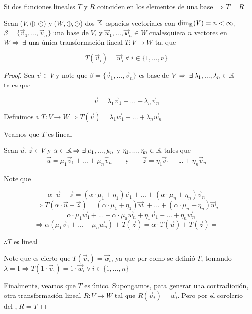 \begin{corollary}
    Si dos funciones lineales $T$ y $R$ coinciden en los elementos de una base $\Rightarrow T = R$
\end{corollary}

\begin{theorem} \label{theomonline1}
    Sean ($V, \oplus, \odot$) y ($W, \oplus, \odot$) dos $\mathbb{K}$-espacios vectoriales con $ {\dim}_{\mathbb{K}}(V) = n < \infty$, $\beta = \{ \vec{v}_{1}, ..., \vec{v}_{n} \}$ una base de $V$, y $\vec{w}_{1}, ..., \vec{w}_{n} \in W$ cualesquiera $n$ vectores en $W \Rightarrow \: \exists$ una única transformación lineal $T : V \to W$ tal que

    $$T(\vec{v}_{i}) = \vec{w}_{i} \: \forall \: i \in \{1, ..., n \}$$
\end{theorem}

\begin{proof}
    Sea $\vec{v} \in V$ y note que $\beta =  \{ \vec{v}_{1}, ..., \vec{v}_{n} \}$ es base de $V \Rightarrow \: \exists \: \lambda_1, ..., \lambda_n \in \mathbb{K}$ tales que

    $$\vec{v} = \lambda_1 \vec{v}_{1} + ... + \lambda_n \vec{v}_{n}$$

    Definimos a $T : V \to W \Rightarrow T(\vec{v}) = \lambda_1 \vec{w}_{1} + ... + \lambda_n \vec{w}_{n}$

    Veamos que $T$ es lineal

    Sean $\vec{u}, \vec{z} \in V$ y $\alpha \in \mathbb{K} \Rightarrow \exists \: \mu_1, ..., \mu_n $ y $\eta_1, ..., \eta_n \in \mathbb{K}$ tales que
    \begin{align*}
      \vec{u} = \mu_1 \vec{v}_{1} + ... + \mu_n \vec{v}_{n}  && \text{ y } && \vec{z} = \eta_1 \vec{v}_{1} + ... + \eta_n \vec{v}_{n}
    \end{align*}

    Note que 

    $$\alpha \cdot \vec{u} + \vec{z} = (\alpha \cdot \mu_1 + \eta_1)\vec{v}_{1} + ... + (\alpha \cdot \mu_n + \eta_n)\vec{v}_{n}$$
    $$\Rightarrow T (\alpha \cdot \vec{u} + \vec{z}) = (\alpha \cdot \mu_1 + \eta_1)\vec{w}_{1} + ... + (\alpha \cdot \mu_n + \eta_n)\vec{w}_{n}$$
    $$= \alpha \cdot \mu_1 \vec{w}_{1} + ... + \alpha \cdot \mu_n \vec{w}_{n} + \eta_1 \vec{v}_{1} + ... + \eta_n \vec{w}_{n}$$
    $$\Rightarrow \alpha (\mu_1 \vec{v}_{1} + ... + \mu_n \vec{w}_{n}) + T(\vec{z}) = \alpha \cdot T(\vec{u}) +  T(\vec{z}) =$$

    $\therefore T$ es lineal

    Note que es cierto que $T(\vec{v}_{i}) = \vec{w}_{i}$, ya que por como se definió $T$, tomando $\lambda = 1 \Rightarrow T(1 \cdot\vec{v}_{i}) = 1 \cdot \vec{w}_{i} \: \forall \: i \in \{1, ..., n \}$

    Finalmente, veamos que $T$ es único. Supongamos, para generar una contradicción, otra transformación lineal $R : V \to W$ tal que $R(\vec{v}_{i}) = \vec{w}_{i}$. Pero por el corolario del , $R = T$
\end{proof}

